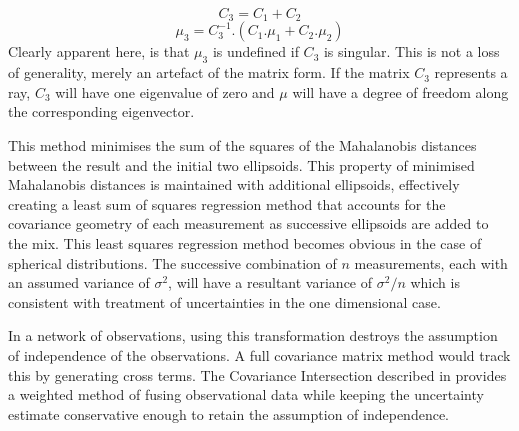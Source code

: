 \documentclass{article}
\newcounter{subsubsubsection}[subsubsection]
\begin{document}
        \begin{equation}
        C_3 = C_1+C_2
        \end{equation}
        \begin{equation}
        \mu_3 = C_3^{-1} . (C_1.\mu_1 + C_2.\mu_2)
        \end{equation}
        Clearly apparent here, is that \(\mu_3\) is undefined if \(C_3\) is singular.
        This is not a loss of generality, merely an artefact of the matrix form.  If the matrix \(C_3\) represents a ray, \(C_3\) will have one eigenvalue of zero and \(\mu\) will have a degree of freedom along the corresponding eigenvector.
        
        This method minimises the sum of the squares of the Mahalanobis distances between the result and the initial two ellipsoids.  This property of minimised Mahalanobis distances is maintained with additional ellipsoids, effectively creating a least sum of squares regression method that accounts for the covariance geometry of each measurement as successive ellipsoids are added to the mix.
        This least squares regression method becomes obvious in the case of spherical distributions.  The successive combination of \(n\) measurements, each with an assumed variance of \(\sigma^2\), will have a resultant variance of \(\sigma^2/n\) which is consistent with treatment of uncertainties in the one dimensional case.

        In a network of observations, using this transformation destroys the assumption of independence of the observations.  A full covariance matrix method would track this by generating cross terms.  The Covariance Intersection described in \cite{CovarNoCorrel} provides a weighted method of fusing observational data while keeping the uncertainty estimate conservative enough to retain the assumption of independence.

      
\end{document}
